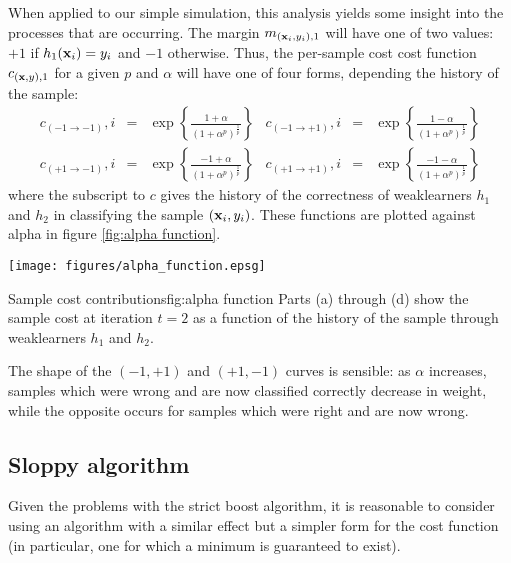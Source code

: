 When applied to our simple simulation, this analysis yields some
insight into the processes that are occurring.  The margin
$m_{(\mathbf{x}_i, y_i), 1}$ will have one of two values: $+1$ if
$h_1(\mathbf{x}_i) = y_i$ and $-1$ otherwise.  Thus, the per-sample cost
cost function $c_{(\mathbf{x}, y), 1}$ for a given $p$ and $\alpha$ will
have one of four forms, depending the history of the sample:
%
\providecommand{\ra}{\rightarrow}
\providecommand{\Pn}{(1 + \alpha^p)^{\frac{1}{p}}}
\begin{equation}
\begin{array}{rclrcl}
c_(-1 \ra -1),i & = & \exp \left\{ \frac{ 1 + \alpha}{\Pn} \right\} &
c_(-1 \ra +1),i & = & \exp \left\{ \frac{ 1 - \alpha}{\Pn} \right\} \\
c_(+1 \ra -1),i & = & \exp \left\{ \frac{-1 + \alpha}{\Pn} \right\} &
c_(+1 \ra +1),i & = & \exp \left\{ \frac{-1 - \alpha}{\Pn} \right\}
\end{array}
\end{equation}
%
where the subscript to $c$ gives the history of the correctness of
weaklearners $h_1$ and $h_2$ in classifying the sample $(\mathbf{x}_i,
y_i)$.  These functions are plotted against alpha in figure
\ref{fig:alpha function}.

\begin{linefigure}
\begin{center}
\texttt{[image: figures/alpha\_function.epsg]}
\end{center}
\begin{capt}{Sample cost contributions}{fig:alpha function}
Parts (a) through (d) show the sample cost at iteration $t=2$ as a
function of the history of the sample through weaklearners $h_1$ and
$h_2$.
\end{capt}
\end{linefigure}

The shape of the $(-1, +1)$ and $(+1, -1)$ curves is
sensible: as $\alpha$ increases, samples which were wrong and are now
classified correctly decrease in weight, while the opposite occurs for
samples which were right and are now wrong.


\subsection{Sloppy algorithm}

Given the problems with the strict boost algorithm, it is reasonable
to consider using an algorithm with a similar effect but a simpler
form for the cost function (in particular, one for which a minimum is
guaranteed to exist).

